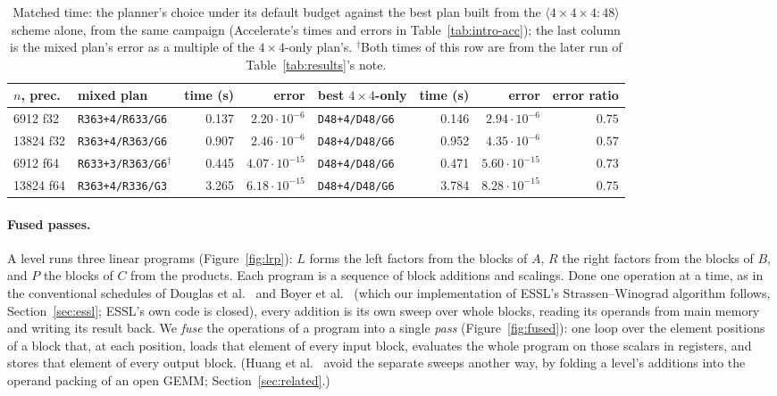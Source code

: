 \documentclass[11pt]{article}
\newcommand{\mm}[1]{\langle #1\rangle}
\newcommand{\lv}[1]{\texttt{#1}}
\begin{document}
\begin{table}[!tbp]
\centering\footnotesize
\begin{tabular}{llrrlrrr}
\toprule
$n$, prec. & mixed plan & time (s) & error & best $4\times4$-only & time (s) & error & error ratio\\
\midrule
6912 f32 & \lv{R363+4/R633/G6} & 0.137 & $2.20\cdot10^{-6}$ & \lv{D48+4/D48/G6} & 0.146 & $2.94\cdot10^{-6}$ & $0.75$\\
13824 f32 & \lv{R363+4/R363/G6} & 0.907 & $2.46\cdot10^{-6}$ & \lv{D48+4/D48/G6} & 0.952 & $4.35\cdot10^{-6}$ & $0.57$\\
6912 f64 & \lv{R633+3/R363/G6}$^\dagger$ & 0.445 & $4.07\cdot10^{-15}$ & \lv{D48+4/D48/G6} & 0.471 & $5.60\cdot10^{-15}$ & $0.73$\\
13824 f64 & \lv{R363+4/R336/G3} & 3.265 & $6.18\cdot10^{-15}$ & \lv{D48+4/D48/G6} & 3.784 & $8.28\cdot10^{-15}$ & $0.75$\\
\bottomrule
\end{tabular}
\caption{Matched time: the planner's choice under its default budget against
the best plan built from the $\mm{4\times4\times4:48}$ scheme alone, from the
same campaign (Accelerate's times and errors in Table~\ref{tab:intro-acc});
the last column is the mixed plan's error as a multiple of the
$4\times4$-only plan's.  $^\dagger$Both times of this row are from the later run of Table~\ref{tab:results}'s note.}
\label{tab:intro-matched}
\end{table}

\paragraph{Fused passes.}
A level runs three linear programs (Figure~\ref{fig:lrp}): $L$ forms the left
factors from the blocks of $A$, $R$ the right factors from the blocks of $B$,
and $P$ the blocks of $C$ from the products.  Each program is a sequence of
block additions and scalings.  Done one operation at a time, as in the conventional schedules of Douglas et al.\ \cite{DHSS94} and Boyer et al.\ \cite{BDPZ09} (which our implementation of ESSL's Strassen--Winograd algorithm follows, Section~\ref{sec:essl}; ESSL's own code is closed), every addition is its own sweep over whole blocks,
reading its operands from main memory and writing its result back.  We
\emph{fuse} the operations of a program into a single \emph{pass}
(Figure~\ref{fig:fused}): one loop
over the element positions of a block that, at each position, loads that
element of every input block, evaluates the whole program on those scalars
in registers, and stores that element of every output block.
(Huang et al.\ \cite{HSvdG16} avoid the separate sweeps another way, by folding a level's additions into the operand packing of an open GEMM; Section~\ref{sec:related}.)
\end{document}
